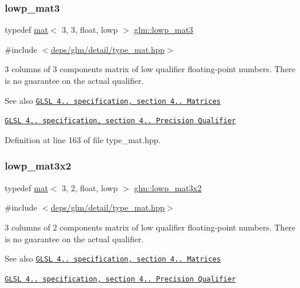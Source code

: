 \subsubsection{\texorpdfstring{lowp\+\_\+mat3}{lowp\_mat3}}
{\footnotesize\ttfamily typedef \hyperlink{structglm_1_1mat}{mat}$<$ 3, 3, float, lowp $>$ \hyperlink{group__core__precision_ga8845e8da3db051cd798abc644850c6c2}{glm\+::lowp\+\_\+mat3}}



{\ttfamily \#include $<$\hyperlink{type__mat_8hpp}{deps/glm/detail/type\+\_\+mat.\+hpp}$>$}

3 columns of 3 components matrix of low qualifier floating-\/point numbers. There is no guarantee on the actual qualifier.

\begin{DoxySeeAlso}{See also}
\href{http://www.opengl.org/registry/doc/GLSLangSpec.4.20.8.pdf}{\tt G\+L\+SL 4.. specification, section 4.. Matrices} 

\href{http://www.opengl.org/registry/doc/GLSLangSpec.4.20.8.pdf}{\tt G\+L\+SL 4.. specification, section 4.. Precision Qualifier} 
\end{DoxySeeAlso}


Definition at line 163 of file type\+\_\+mat.\+hpp.

\mbox{\label{group__core__precision_ga90265674cd36951273e63c70689d9a86}} 
\subsubsection{\texorpdfstring{lowp\+\_\+mat3x2}{lowp\_mat3x2}}
{\footnotesize\ttfamily typedef \hyperlink{structglm_1_1mat}{mat}$<$ 3, 2, float, lowp $>$ \hyperlink{group__core__precision_ga90265674cd36951273e63c70689d9a86}{glm\+::lowp\+\_\+mat3x2}}



{\ttfamily \#include $<$\hyperlink{type__mat_8hpp}{deps/glm/detail/type\+\_\+mat.\+hpp}$>$}

3 columns of 2 components matrix of low qualifier floating-\/point numbers. There is no guarantee on the actual qualifier.

\begin{DoxySeeAlso}{See also}
\href{http://www.opengl.org/registry/doc/GLSLangSpec.4.20.8.pdf}{\tt G\+L\+SL 4.. specification, section 4.. Matrices} 

\href{http://www.opengl.org/registry/doc/GLSLangSpec.4.20.8.pdf}{\tt G\+L\+SL 4.. specification, section 4.. Precision Qualifier} 
\end{DoxySeeAlso}


